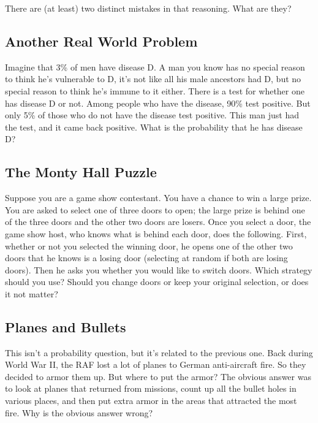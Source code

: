 \documentclass[11pt,]{article}
\begin{document}
There are (at least) two distinct mistakes in that reasoning. What are
they?

\hypertarget{another-real-world-problem}{%
\subsection{Another Real World
Problem}\label{another-real-world-problem}}

Imagine that 3\% of men have disease D. A man you know has no special
reason to think he's vulnerable to D, it's not like all his male
ancestors had D, but no special reason to think he's immune to it
either. There is a test for whether one has disease D or not. Among
people who have the disease, 90\% test positive. But only 5\% of those
who do not have the disease test positive. This man just had the test,
and it came back positive. What is the probability that he has disease
D?

\hypertarget{the-monty-hall-puzzle}{%
\subsection{The Monty Hall Puzzle}\label{the-monty-hall-puzzle}}

Suppose you are a game show contestant. You have a chance to win a large
prize. You are asked to select one of three doors to open; the large
prize is behind one of the three doors and the other two doors are
losers. Once you select a door, the game show host, who knows what is
behind each door, does the following. First, whether or not you selected
the winning door, he opens one of the other two doors that he knows is a
losing door (selecting at random if both are losing doors). Then he asks
you whether you would like to switch doors. Which strategy should you
use? Should you change doors or keep your original selection, or does it
not matter?

\hypertarget{planes-and-bullets}{%
\subsection{Planes and Bullets}\label{planes-and-bullets}}

This isn't a probability question, but it's related to the previous one.
Back during World War II, the RAF lost a lot of planes to German
anti-aircraft fire. So they decided to armor them up. But where to put
the armor? The obvious answer was to look at planes that returned from
missions, count up all the bullet holes in various places, and then put
extra armor in the areas that attracted the most fire. Why is the
obvious answer wrong?
\end{document}
